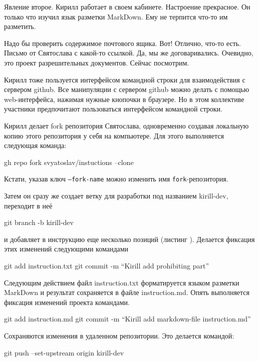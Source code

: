 \documentclass[14pt,a4paper]{article}
\begin{document}
Явление второе.
Кирилл работает в своем кабинете. Настроение прекрасное. Он только что изучил язык разметки
MarkDown. Ему не терпится что-то им разметить. 

 Надо бы проверить содержимое почтового ящика. Вот! Отлично, что-то есть. 
Письмо от Святослава с какой-то ссылкой. Да, мы же договаривались. Очевидно, это проект
разрешительных документов. Сейчас посмотрим.

 Кирилл тоже пользуется интерфейсом командной строки для взаимодействия с сервером
github. Все манипуляции с сервером github можно делать с помощью web-интерфейса, нажимая
	нужные кнопочки в браузере. Но в этом коллективе участники предпочитают пользоваться интерфейсом
командной строки. 

Кирилл делает fork репозитория Святослава, одновременно
создавая локальную копию этого репозитория у себя на компьютере. Для этого выполняется следующая
команда:

gh repo fork svyatoslav/instuctions --clone

Кстати, указав ключ \texttt{--fork-name} можно изменить имя \texttt{fork}-репозитория.

Затем он сразу же создает ветку для разработки под названием kirill-dev, переходит в  неё 

git branch -b kirill-dev

и добавляет в инструкцию еще несколько позиций (листинг ).
Делается фиксация этих изменений следующими командами

git add instruction.txt
git commit -m ``Kirill add prohibiting part''

Следующим действием файл instruction.txt форматируется языком разметки MarkDown и результат 
сохраняется в файле instruction.md.
Опять выполняется фиксация изменений проекта командами. 

git add instruction.md
git commit -m ``Kirill add markdown-file instruction.md''

Сохраняются изменения в удаленном репозитории. Это делается командой:

git push --set-upstream origin kirill-dev
\end{document}
